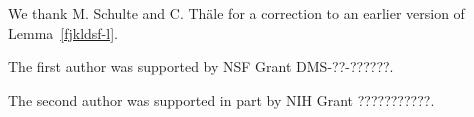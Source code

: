 \documentclass[bj,authoryear,noshowframe]{imsart}
\theoremstyle{plain}
\theoremstyle{remark}
\begin{document}

\begin{acks}[Acknowledgments]
  We thank M. Schulte and C. Th\"ale for a correction to an earlier
  version of Lemma~\ref{fjkldsf-l}.
\end{acks}

\begin{funding}
The first author was supported by NSF Grant DMS-??-??????.

The second author was supported in part by NIH Grant ???????????.
\end{funding}


\end{document}

